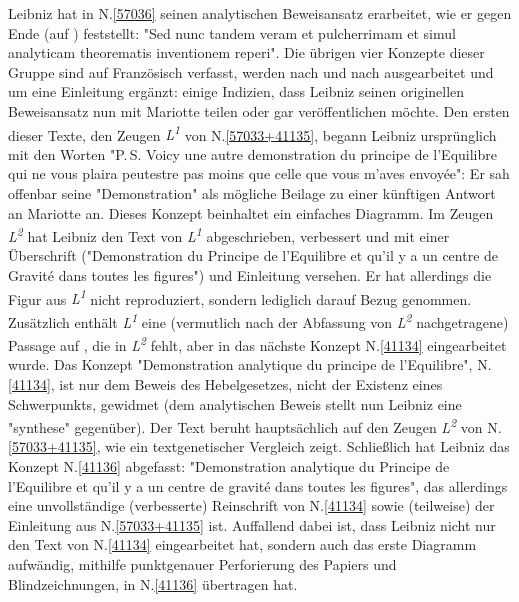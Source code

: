 \begin{ledgroup}
Leibniz hat in N.\;\ref{57036} seinen analytischen Beweisansatz erarbeitet, wie er gegen Ende (auf ) feststellt:
"Sed nunc tandem veram et pulcherrimam et simul analyticam theorematis inventionem reperi".
\pend
\pstart
Die übrigen vier Konzepte dieser Gruppe sind auf Französisch verfasst, werden nach und nach ausgearbeitet und um eine Einleitung ergänzt: einige Indizien, dass Leibniz seinen originellen Beweisansatz nun mit Mariotte teilen oder gar veröffentlichen möchte.
Den ersten dieser Texte, den Zeugen \textit{L\textsuperscript{1}}  von N.\;\ref{57033+41135}, begann Leibniz ursprünglich mit den Worten "P.\,S. Voicy une autre demonstration du principe de l'Equilibre qui ne vous plaira peutestre pas moins que celle que vous m'aves envoyée": Er sah offenbar seine "Demonstration" als mögliche Beilage zu einer künftigen Antwort an Mariotte an. Dieses Konzept beinhaltet ein einfaches Diagramm.
Im Zeugen \textit{L\textsuperscript{2}} hat Leibniz den Text von \textit{L\textsuperscript{1}} abgeschrieben, verbessert und mit einer Überschrift ("Demonstration du Principe de l'Equilibre et qu'il y a un centre de Gravité dans toutes les figures") und Einleitung versehen. Er hat allerdings die Figur aus \textit{L\textsuperscript{1}} nicht reproduziert, sondern  lediglich darauf Bezug genommen.
Zusätzlich enthält \textit{L\textsuperscript{1}} eine (vermutlich nach der Abfassung von \textit{L\textsuperscript{2}} nachgetragene) Passage auf , die  in \textit{L\textsuperscript{2}} fehlt, aber  in das nächste Konzept N.\;\ref{41134} eingearbeitet wurde.
\pend
\pstart
Das Konzept "Demonstration analytique du principe de l'Equilibre", N.\;\ref{41134}, ist nur dem Beweis des Hebelgesetzes, nicht der Existenz eines Schwerpunkts, gewidmet (dem analytischen Beweis stellt nun Leibniz eine "synthese" gegenüber). Der Text beruht hauptsächlich auf den Zeugen  \textit{L\textsuperscript{2}} von N.\;\ref{57033+41135}, wie ein textgenetischer Vergleich zeigt.
\pend
\pstart
Schließlich hat Leibniz das Konzept N.\;\ref{41136} abgefasst: "Demonstration analytique du Principe de l’Equilibre et qu’il y a un centre de gravité dans toutes les figures", das allerdings eine unvollständige (verbesserte) Reinschrift von N.\;\ref{41134} sowie (teilweise) der Einleitung aus N.\;\ref{57033+41135} ist.
Auffallend dabei ist, dass Leibniz nicht nur den Text von N.\;\ref{41134} eingearbeitet hat, sondern auch das erste Diagramm aufwändig, mithilfe punktgenauer Perforierung des Papiers und Blindzeichnungen, in N.\;\ref{41136} übertragen hat.

\end{ledgroup}

